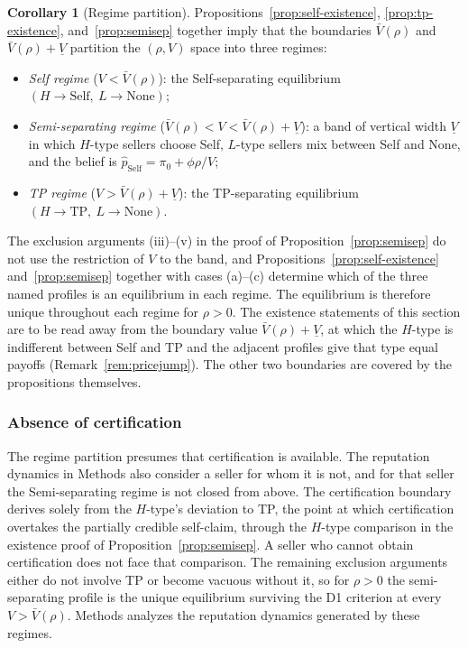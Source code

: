 \documentclass[11pt,letterpaper]{article}
\theoremstyle{definition}
\newtheorem{corollary}{Corollary}[section]
\begin{document}
\begin{corollary}[Regime partition]\label{cor:regimes}
Propositions~\ref{prop:self-existence}, \ref{prop:tp-existence}, and~\ref{prop:semisep} together imply that the boundaries $\bar{V}(\rho)$ and $\bar{V}(\rho) + \underline{V}$ partition the $(\rho, V)$ space into three regimes:
\begin{itemize}
\item \textit{Self regime} ($V < \bar{V}(\rho)$): the Self-separating equilibrium $(H \to \text{Self},\ L \to \text{None})$;
\item \textit{Semi-separating regime} ($\bar{V}(\rho) < V < \bar{V}(\rho) + \underline{V}$): a band of vertical width $\underline{V}$ in which $H$-type sellers choose Self, $L$-type sellers mix between Self and None, and the belief is $\hat{p}_{\text{Self}} = \pi_0 + \phi\rho/V$;
\item \textit{TP regime} ($V > \bar{V}(\rho) + \underline{V}$): the TP-separating equilibrium $(H \to \text{TP},\ L \to \text{None})$.
\end{itemize}
The exclusion arguments (iii)--(v) in the proof of Proposition~\ref{prop:semisep} do not use the restriction of $V$ to the band, and Propositions~\ref{prop:self-existence} and~\ref{prop:semisep} together with cases (a)--(c) determine which of the three named profiles is an equilibrium in each regime. The equilibrium is therefore unique throughout each regime for $\rho > 0$. The existence statements of this section are to be read away from the boundary value $\bar{V}(\rho) + \underline{V}$, at which the $H$-type is indifferent between Self and TP and the adjacent profiles give that type equal payoffs (Remark~\ref{rem:pricejump}). The other two boundaries are covered by the propositions themselves.
\end{corollary}

\subsubsection*{Absence of certification}

The regime partition presumes that certification is available. The reputation dynamics in Methods also consider a seller for whom it is not, and for that seller the Semi-separating regime is not closed from above. The certification boundary derives solely from the $H$-type's deviation to TP, the point at which certification overtakes the partially credible self-claim, through the $H$-type comparison in the existence proof of Proposition~\ref{prop:semisep}. A seller who cannot obtain certification does not face that comparison. The remaining exclusion arguments either do not involve TP or become vacuous without it, so for $\rho > 0$ the semi-separating profile is the unique equilibrium surviving the D1 criterion at every $V > \bar{V}(\rho)$. Methods analyzes the reputation dynamics generated by these regimes.
\end{document}
